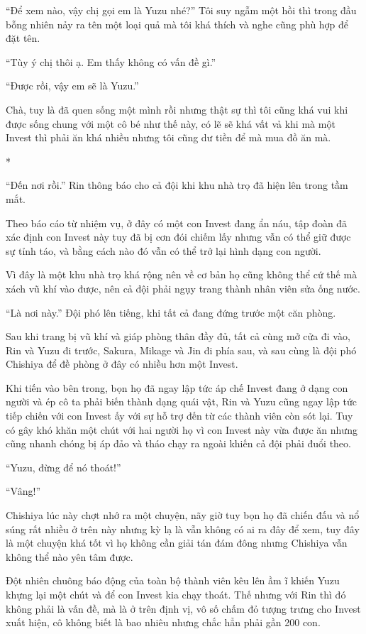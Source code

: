 {``Để xem nào, vậy chị gọi em là Yuzu nhé?'' Tôi suy ngẫm một hồi thì
trong đầu bỗng nhiên nảy ra tên một loại quả mà tôi khá thích và nghe
cũng phù hợp để đặt tên.

``Tùy ý chị thôi ạ. Em thấy không có vấn đề gì.''

``Được rồi, vậy em sẽ là Yuzu.''

Chà, tuy là đã quen sống một mình rồi nhưng thật sự thì tôi cũng khá vui
khi được sống chung với một cô bé như thế này, có lẽ sẽ khá vất vả khi
mà một Invest thì phải ăn khá nhiều nhưng tôi cũng dư tiền để mà mua đồ
ăn mà.

*

``Đến nơi rồi.'' Rin thông báo cho cả đội khi khu nhà trọ đã hiện lên
trong tầm mắt.

Theo báo cáo từ nhiệm vụ, ở đây có một con Invest đang ẩn náu, tập đoàn
đã xác định con Invest này tuy đã bị cơn đói chiếm lấy nhưng vẫn có thể
giữ được sự tỉnh táo, và bằng cách nào đó vẫn có thể trở lại hình dạng
con người.

Vì đây là một khu nhà trọ khá rộng nên về cơ bản họ cũng không thể cứ
thế mà xách vũ khí vào được, nên cả đội phải ngụy trang thành nhân viên
sửa ống nước.

``Là nơi này.'' Đội phó lên tiếng, khi tất cả đang đứng trước một căn
phòng.

Sau khi trang bị vũ khí và giáp phòng thân đầy đủ, tất cả cùng mở cửa đi
vào, Rin và Yuzu đi trước, Sakura, Mikage và Jin đi phía sau, và sau
cùng là đội phó Chishiya để đề phòng ở đây có nhiều hơn một Invest.

Khi tiến vào bên trong, bọn họ đã ngay lập tức áp chế Invest đang ở dạng
con người và ép cô ta phải biến thành dạng quái vật, Rin và Yuzu cũng
ngay lập tức tiếp chiến với con Invest ấy với sự hỗ trợ đến từ các thành
viên còn sót lại. Tuy có gây khó khăn một chút với hai người họ vì con
Invest này vừa được ăn nhưng cũng nhanh chóng bị áp đảo và tháo chạy ra
ngoài khiến cả đội phải đuổi theo.

``Yuzu, đừng để nó thoát!''

``Vâng!''

Chishiya lúc này chợt nhớ ra một chuyện, nãy giờ tuy bọn họ đã chiến đấu
và nổ súng rất nhiều ở trên này nhưng kỳ lạ là vẫn không có ai ra đây để
xem, tuy đây là một chuyện khá tốt vì họ không cần giải tán đám đông
nhưng Chishiya vẫn không thể nào yên tâm được.

Đột nhiên chuông báo động của toàn bộ thành viên kêu lên ầm ĩ khiến Yuzu
khựng lại một chút và để con Invest kia chạy thoát. Thế nhưng với Rin
thì đó không phải là vấn đề, mà là ở trên định vị, vô số chấm đỏ tượng
trưng cho Invest xuất hiện, cô không biết là bao nhiêu nhưng chắc hẳn
phải gần 200 con.

}
